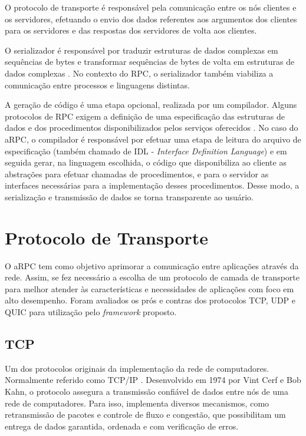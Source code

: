 O protocolo de transporte é responsável pela comunicação entre os nós clientes e os servidores, efetuando o envio dos dados referentes aos argumentos dos clientes para os servidores e das respostas dos servidores de volta aos clientes.

O serializador é responsável por traduzir estruturas de dados complexas em sequências de bytes e transformar sequências de bytes de volta em estruturas de dados complexas \cite{newmarch_data_2017}. No contexto do RPC, o serializador também viabiliza a comunicação entre processos e linguagens distintas.

A geração de código é uma etapa opcional, realizada por um compilador. Alguns protocolos de RPC exigem a definição de uma especificação das estruturas de dados e dos procedimentos disponibilizados pelos serviços oferecidos \cite{ford_using_1995}. No caso do aRPC, o compilador é responsável por efetuar uma etapa de leitura do arquivo de especificação (também chamado de IDL - \textit{Interface Definition Language}) e em seguida gerar, na linguagem escolhida, o código que disponibiliza ao cliente as abstrações para efetuar chamadas de procedimentos, e para o servidor as interfaces necessárias para a implementação desses procedimentos. Desse modo, a serialização e transmissão de dados se torna transparente ao usuário.

\section{Protocolo de Transporte}

O aRPC tem como objetivo aprimorar a comunicação entre aplicações através da rede. Assim, se fez necessário a escolha de um protocolo de camada de transporte para melhor atender às características e necessidades de aplicações com foco em alto desempenho. Foram avaliados os prós e contras dos protocolos TCP, UDP e QUIC para utilização pelo \textit{framework} proposto.


\subsection{TCP}

Um dos protocolos originais da implementação da rede de computadores. Normalmente referido como TCP/IP \cite{cerf_protocol_1974}.
Desenvolvido em 1974 por Vint Cerf e Bob Kahn, o protocolo assegura a transmissão confiável de dados entre nós de uma rede de computadores. Para isso, implementa diversos mecanismos, como retransmissão de pacotes e controle de fluxo e congestão, que possibilitam um entrega de dados garantida, ordenada e com verificação de erros.

